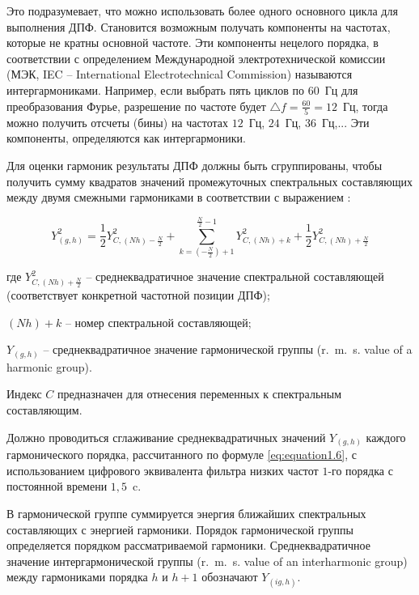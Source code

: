 Это подразумевает, что можно использовать более одного основного цикла для выполнения ДПФ. Становится возможным получать компоненты на частотах, которые не кратны основной частоте. Эти компоненты нецелого порядка, в соответствии с определением  Международной электротехнической комиссии (МЭК, IEC -- International Electrotechnical Commission) называются интергармониками. Например, если выбрать пять циклов по $60$~Гц для преобразования Фурье, разрешение по частоте будет $\bigtriangleup f = \frac{60}{5} = 12$~Гц, тогда можно получить отсчеты (бины) на частотах $12$~Гц, $24$~Гц, $36$~Гц,... Эти компоненты, определяются как интергармоники.

Для оценки гармоник результаты ДПФ должны быть сгруппированы, чтобы получить сумму квадратов значений промежуточных спектральных составляющих между двумя смежными гармониками в соответствии с выражением \cite{GOST30804.4.7-2013}: 
 
\begin{equation}
	\label{eq:equation1.6}
Y_{(g,h)}^2 = \frac{1}{2} Y_{C,(Nh)-\frac{N}{2}}^2 +  \displaystyle\sum_{k=(-\frac{N}{2})+1}^{\frac{N}{2}-1} Y_{C,(Nh)+k}^2 + \frac{1}{2} Y_{C,(Nh)+\frac{N}{2}}^2
\end{equation} 
 
где $Y_{C,(Nh)+\frac{N}{2}}^2$  – среднеквадратичное значение спектральной составляющей (соответствует конкретной частотной позиции ДПФ);

$(Nh) + k$ – номер спектральной составляющей;

$Y_{(g,h)}$ –   среднеквадратичное значение гармонической группы (r.~m.~s. value of a harmonic group).

Индекс $C$ предназначен для отнесения переменных к спектральным составляющим.

Должно проводиться сглаживание среднеквадратичных значений $Y_{(g,h)}$ каждого гармонического порядка, рассчитанного по формуле \ref{eq:equation1.6}, с использованием цифрового эквивалента фильтра низких частот $1$-го порядка с постоянной времени  $1,5$~c.

В гармонической группе суммируется энергия ближайших спектральных составляющих с энергией гармоники. Порядок гармонической группы определяется порядком рассматриваемой гармоники. Среднеквадратичное значение интергармонической группы (r.~m.~s. value of an interharmonic group) между гармониками порядка $h$ и $h+1$ обозначают $Y_{(ig,h)}$.

